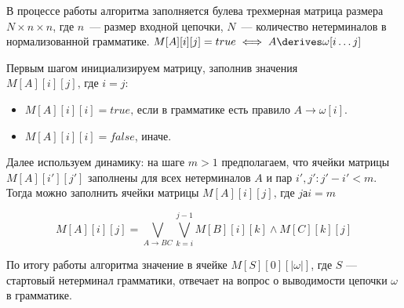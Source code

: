 В процессе работы алгоритма заполняется булева трехмерная матрица размера $N \times n \times n$, где $n$~---  размер входной цепочки, $N$~--- количество нетерминалов в нормализованной грамматике. 
$M[A][i][j] = true \iff A \derives \omega[i \dots j]$

Первым шагом инициализируем матрицу, заполнив значения $M[A][i][j] \text{, где }i = j$: 

\begin{itemize}
  \item $M[A][i][i] = true \text{, если в грамматике есть правило } A \to \omega[i]$.
  \item $M[A][i][i] = false$, иначе.
\end{itemize}

Далее используем динамику: на шаге $m > 1$ предполагаем, что ячейки матрицы $M[A][i'][j']$ заполнены для всех нетерминалов $A$ и пар $i', j': j' - i' < m$.
Тогда можно заполнить ячейки матрицы $M[A][i][j] \text{, где } jаi = m$

\[ M[A][i][j] = \bigvee_{A \to B C}^{}{\bigvee_{k=i}^{j-1}{M[B][i][k] \wedge M[C][k][j]}} \]

По итогу работы алгоритма значение в ячейке $M[S][0][|\omega|]$, где $S$ --- стартовый нетерминал грамматики, отвечает на вопрос о выводимости цепочки $\omega$ в грамматике. 

